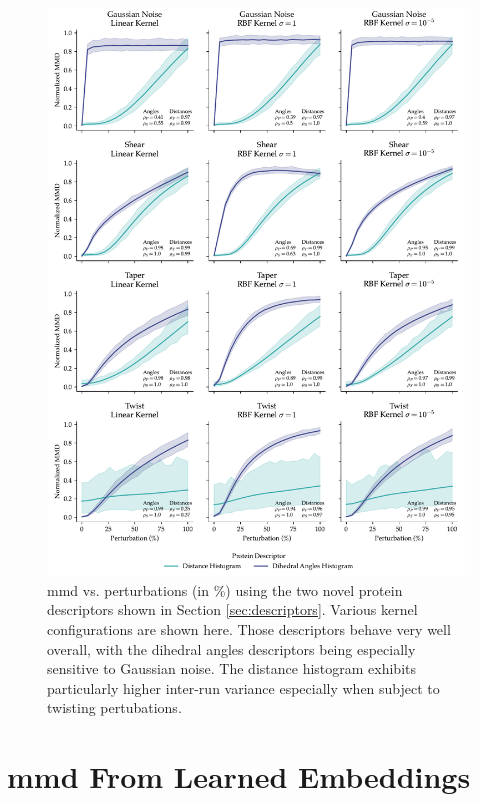 \begin{figure}
  \includegraphics[width=\textwidth]{./figures/results/res_4.pdf}
  \caption[\acrshort{mmd} vs. perturbations using the two novel protein descriptors.]{\acrshort{mmd}
vs. perturbations (in \%) using the two novel protein descriptors shown in Section
\ref{sec:descriptors}. Various kernel configurations are shown here. Those
descriptors behave very well overall, with the dihedral angles descriptors being
especially sensitive to Gaussian noise. The distance histogram exhibits
particularly higher inter-run variance especially when subject to twisting
pertubations.}
  \label{fig:protein_specific_descriptors}
\end{figure}

\section{\acrshort{mmd} From Learned Embeddings}

